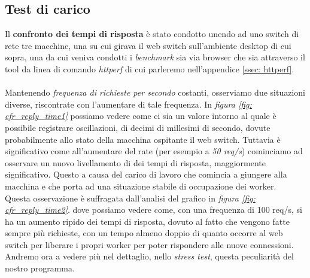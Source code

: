 \documentclass[italian]{tktltiki2}
\begin{document}
\subsection{Test di carico}
Il \textbf{confronto dei tempi di risposta} è stato condotto unendo ad uno switch di rete tre macchine, una su cui girava il web switch sull'ambiente desktop di cui sopra, una da cui veniva condotti i \emph{benchmark} sia via browser che sia attraverso il tool da linea di comando \emph{httperf} di cui parleremo nell'appendice \ref{ssec: httperf}.
\\
\\
Mantenendo \emph{frequenza di richieste per secondo} costanti, osserviamo due situazioni diverse, riscontrate con l'aumentare di tale frequenza. In \emph{figura \ref{fig: cfr_reply_time1}} possiamo vedere come ci sia un valore intorno al quale è possibile registrare oscillazioni, di decimi di millesimi di secondo, dovute probabilmente allo stato della macchina ospitante il web switch. Tuttavia è significativo come all'aumentare del rate (per esempio a \emph{50 req/s}) cominciamo ad osservare un nuovo livellamento di dei tempi di risposta, maggiormente significativo. Questo a causa del carico di lavoro che comincia a giungere alla macchina e che porta ad una situazione stabile di occupazione dei worker. 
\\ 
Questa osservazione è suffragata dall'analisi del grafico in \emph{figura \ref{fig: cfr_reply_time2}}. dove possiamo vedere come, con una frequenza di 100 req/s, si ha un aumento ripido dei tempi di risposta, dovuto al fatto che vengono fatte sempre più richieste, con un tempo almeno doppio di quanto occorre al web switch per liberare i propri worker per poter rispondere alle nuove connessioni. Andremo ora a vedere più nel dettaglio, nello \emph{stress test}, questa peculiarità del nostro programma.
\end{document}
